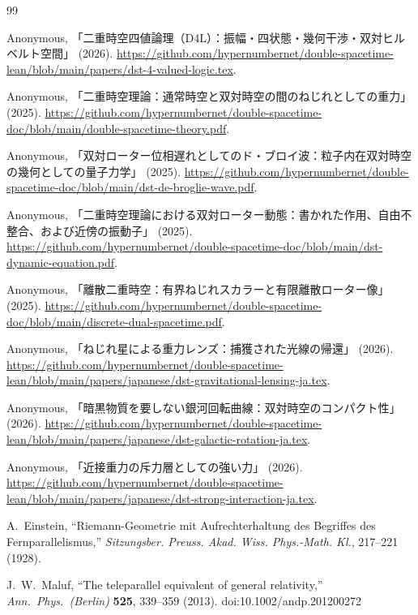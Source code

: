 \documentclass[a4paper]{article}
\begin{document}

\begin{thebibliography}{99}
\raggedright

Anonymous,
「二重時空四値論理（D4L）：振幅・四状態・幾何干渉・双対ヒルベルト空間」 (2026).
\url{https://github.com/hypernumbernet/double-spacetime-lean/blob/main/papers/dst-4-valued-logic.tex}.

Anonymous,
「二重時空理論：通常時空と双対時空の間のねじれとしての重力」 (2025).
\url{https://github.com/hypernumbernet/double-spacetime-doc/blob/main/double-spacetime-theory.pdf}.

Anonymous,
「双対ローター位相遅れとしてのド・ブロイ波：粒子内在双対時空の幾何としての量子力学」 (2025).
\url{https://github.com/hypernumbernet/double-spacetime-doc/blob/main/dst-de-broglie-wave.pdf}.

Anonymous,
「二重時空理論における双対ローター動態：書かれた作用、自由不整合、および近傍の振動子」 (2025).
\url{https://github.com/hypernumbernet/double-spacetime-doc/blob/main/dst-dynamic-equation.pdf}.

Anonymous,
「離散二重時空：有界ねじれスカラーと有限離散ローター像」 (2025).
\url{https://github.com/hypernumbernet/double-spacetime-doc/blob/main/discrete-dual-spacetime.pdf}.

Anonymous,
「ねじれ星による重力レンズ：捕獲された光線の帰還」 (2026).
\url{https://github.com/hypernumbernet/double-spacetime-lean/blob/main/papers/japanese/dst-gravitational-lensing-ja.tex}.

Anonymous,
「暗黒物質を要しない銀河回転曲線：双対時空のコンパクト性」 (2026).
\url{https://github.com/hypernumbernet/double-spacetime-lean/blob/main/papers/japanese/dst-galactic-rotation-ja.tex}.

Anonymous,
「近接重力の斥力層としての強い力」 (2026).
\url{https://github.com/hypernumbernet/double-spacetime-lean/blob/main/papers/japanese/dst-strong-interaction-ja.tex}.

A.~Einstein,
``Riemann-Geometrie mit Aufrechterhaltung des Begriffes des Fernparallelismus,''
\textit{Sitzungsber. Preuss. Akad. Wiss. Phys.-Math. Kl.},
217--221 (1928).

J.~W.~Maluf,
``The teleparallel equivalent of general relativity,''
\textit{Ann.\ Phys.\ (Berlin)} \textbf{525}, 339--359 (2013).
doi:10.1002/andp.201200272


\end{thebibliography}
\end{document}
